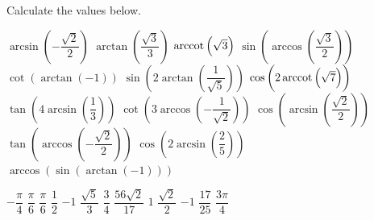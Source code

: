 \ifcalculus\pagebreak\fi

\begin{Exercise} Calculate the values below. 
\begin{multicols}{2}
	\Question[difficulty = 1] $\arcsin\left(-\dfrac{\sqrt{2}}{2}\right)$
	\Question[difficulty = 1] $\arctan \left(\dfrac{\sqrt{3}}{3}\right)$
	\Question[difficulty = 1] $\operatorname{arccot} \left(\sqrt{3}\right)$
	\Question[difficulty = 1] $\sin \left( \arccos  \left( \dfrac{\sqrt{3}}{2}\right) \right)$
	\Question[difficulty = 1] $\cot \left(\arctan  (-1)\right)$
	\ifanalysis\Question[difficulty = 1]\fi\ifcalculus\Question[difficulty = 2]\fi $\sin \left(2 \arctan   \left(\dfrac{1}{\sqrt{5}}\right)\right)$
	\ifanalysis\Question[difficulty = 1]\fi\ifcalculus\Question[difficulty = 2]\fi $\cos \left(2 \operatorname{arccot}    \left(\sqrt{7}\right)\right)$
	\Question[difficulty = 2] $\tan \left(4 \arcsin   \left(\dfrac{1}{3}\right)\right)$
	\Question[difficulty = 2] $\cot \left(3 \arccos   \left(-\dfrac{1}{\sqrt{2}}\right)\right)$
	\Question[difficulty = 1] $\cos\left(\arcsin \left(\dfrac{\sqrt{2}}{2}\right)\right)$
	\Question[difficulty = 1] $\tan \left(\arccos \left(-\dfrac{\sqrt{2}}{2}\right)\right)$
    \ifanalysis\Question[difficulty = 1]\fi\ifcalculus\Question[difficulty = 2]\fi $\cos \left(2 \arcsin \left( \dfrac{2}{5} \right) \right)$ %
    \Question[difficulty = 2] $\arccos \left(\sin \left(  \arctan (-1) \right) \right)$ 
	\EndCurrentQuestion
\end{multicols}

\end{Exercise}

\begin{Answer}\phantom{}
    \begin{multicols}{3}
    	
    		\Question $-\dfrac{\pi}{4}$
    		\Question $\dfrac{\pi}{6}$
    		\Question $\dfrac{\pi}{6}$
    		\Question $\dfrac{1}{2}$
    		\Question $-1$
    		\Question $\dfrac{\sqrt{5}}{3}$
    		\Question $\dfrac{3}{4}$
    		\Question $\dfrac{56\sqrt{2}}{17}$
    		\Question $1$
    		\Question $\dfrac{\sqrt{2}}{2}$
    		\Question $-1$
    		\Question $\dfrac{17}{25}$
    		\Question $\dfrac{3\pi}{4}$
    	\EndCurrentQuestion
    \end{multicols}
\end{Answer}

